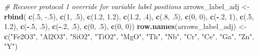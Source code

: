 \documentclass[12pt,]{book}
\newenvironment{Shaded}{\begin{snugshade}}{\end{snugshade}}
\newcommand{\CommentTok}[1]{\textcolor[rgb]{0.56,0.35,0.01}{\textit{#1}}}
\newcommand{\DataTypeTok}[1]{\textcolor[rgb]{0.13,0.29,0.53}{#1}}
\newcommand{\DecValTok}[1]{\textcolor[rgb]{0.00,0.00,0.81}{#1}}
\newcommand{\FloatTok}[1]{\textcolor[rgb]{0.00,0.00,0.81}{#1}}
\newcommand{\KeywordTok}[1]{\textcolor[rgb]{0.13,0.29,0.53}{\textbf{#1}}}
\newcommand{\NormalTok}[1]{#1}
\newcommand{\OperatorTok}[1]{\textcolor[rgb]{0.81,0.36,0.00}{\textbf{#1}}}
\newcommand{\OtherTok}[1]{\textcolor[rgb]{0.56,0.35,0.01}{#1}}
\newcommand{\StringTok}[1]{\textcolor[rgb]{0.31,0.60,0.02}{#1}}
\begin{document}
\begin{Shaded}
\begin{Highlighting}[]
\CommentTok{# Recover protocol 1 override for variable label positions }
\NormalTok{arrows_label_adj <-}\StringTok{ }\KeywordTok{rbind}\NormalTok{( }\KeywordTok{c}\NormalTok{(.}\DecValTok{5}\NormalTok{, }\FloatTok{-.5}\NormalTok{), }\KeywordTok{c}\NormalTok{(}\DecValTok{1}\NormalTok{, }\FloatTok{.5}\NormalTok{), }\KeywordTok{c}\NormalTok{(}\FloatTok{1.2}\NormalTok{, }\FloatTok{1.2}\NormalTok{), }
                           \KeywordTok{c}\NormalTok{(}\FloatTok{1.2}\NormalTok{, }\FloatTok{.4}\NormalTok{), }\KeywordTok{c}\NormalTok{(.}\DecValTok{8}\NormalTok{, }\FloatTok{.5}\NormalTok{), }\KeywordTok{c}\NormalTok{(}\DecValTok{0}\NormalTok{, }\DecValTok{0}\NormalTok{), }
                           \KeywordTok{c}\NormalTok{(}\OperatorTok{-}\NormalTok{.}\DecValTok{2}\NormalTok{, }\DecValTok{1}\NormalTok{), }\KeywordTok{c}\NormalTok{(.}\DecValTok{5}\NormalTok{, }\FloatTok{1.2}\NormalTok{), }\KeywordTok{c}\NormalTok{(}\OperatorTok{-}\NormalTok{.}\DecValTok{5}\NormalTok{, }\FloatTok{.5}\NormalTok{),}
                           \KeywordTok{c}\NormalTok{(}\OperatorTok{-}\NormalTok{.}\DecValTok{2}\NormalTok{, }\FloatTok{.5}\NormalTok{), }\KeywordTok{c}\NormalTok{(}\DecValTok{0}\NormalTok{, }\FloatTok{.5}\NormalTok{), }\KeywordTok{c}\NormalTok{(}\DecValTok{0}\NormalTok{, }\DecValTok{0}\NormalTok{))}
\KeywordTok{row.names}\NormalTok{(arrows_label_adj) <-}\StringTok{ }\KeywordTok{c}\NormalTok{(}\StringTok{"Fe2O3"}\NormalTok{, }\StringTok{"Al2O3"}\NormalTok{, }\StringTok{"SiO2"}\NormalTok{, }
                                 \StringTok{"TiO2"}\NormalTok{, }\StringTok{"MgO"}\NormalTok{, }\StringTok{"Th"}\NormalTok{, }
                                 \StringTok{"Nb"}\NormalTok{, }\StringTok{"Cr"}\NormalTok{, }\StringTok{"Ce"}\NormalTok{,}
                                 \StringTok{"Ga"}\NormalTok{, }\StringTok{"Zn"}\NormalTok{, }\StringTok{"Y"}\NormalTok{)}
\end{Highlighting}
\end{Shaded}

\begin{Shaded}
\end{Shaded}
\end{document}
